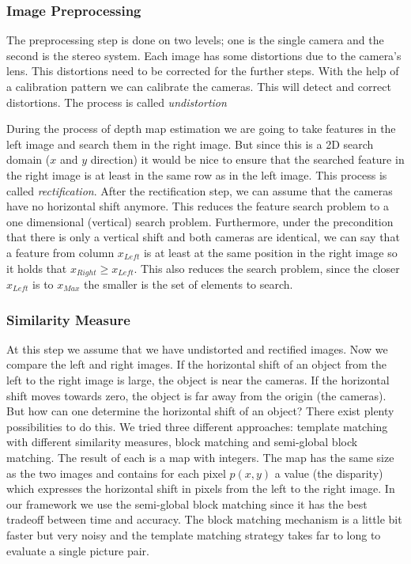 \documentclass[11pt]{article}
\begin{document}
\subsubsection{Image Preprocessing} %
The preprocessing step is done on two levels; one is the single camera and the second is the stereo system. Each image has some distortions due to the camera's lens. This distortions need to be corrected for the further steps. With the help of a calibration pattern we can calibrate the cameras. This will detect and correct distortions. The process is called \emph{undistortion}

During the process of depth map estimation we are going to take features in the left image and search them in the right image. But since this is a 2D search domain ($x$ and $y$ direction) it would be nice to ensure that the searched feature in the right image is at least in the same row as in the left image. This process is called \emph{rectification}. After the rectification step, we can assume that the cameras have no horizontal shift anymore. This reduces the feature search problem to a one dimensional (vertical) search problem. Furthermore, under the precondition that there is only a vertical shift and both cameras are identical, we can say that a feature from column $x_{Left}$ is at least at the same position in the right image so it holds that $x_{Right}\geq x_{Left}$. This also reduces the search problem, since the closer $x_{Left}$ is to $x_{Max}$ the smaller is the set of elements to search.

\subsubsection{Similarity Measure}%
At this step we assume that we have undistorted and rectified images. Now we compare the left and right images. If the horizontal shift of an object from the left to the right image is large, the object is near the cameras. If the horizontal shift moves towards zero, the object is far away from the origin (the cameras). But how can one determine the horizontal shift of an object? There exist plenty possibilities to do this. We tried three different approaches: template matching with different similarity measures, block matching and semi-global block matching. The result of each is a map with integers. The map has the same size as the two images and contains for each pixel $p(x,y)$ a value (the disparity) which expresses the horizontal shift in pixels from the left to the right image. In our framework we use the semi-global block matching since it has the best tradeoff between time and accuracy. The block matching mechanism is a little bit faster but very noisy and the template matching strategy takes far to long to evaluate a single picture pair. %
\end{document}
